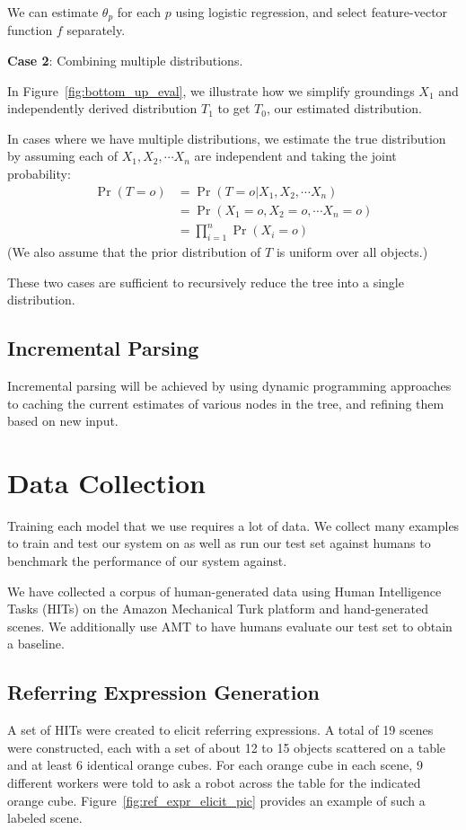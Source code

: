 \documentclass[letterpaper,10pt]{article}
\begin{document}
We can estimate $\theta_p$ for each $p$ using logistic regression, and select feature-vector function $f$ separately.

\textbf{Case 2}: Combining multiple distributions.

In Figure~\ref{fig:bottom_up_eval}, we illustrate how we simplify groundings $X_1$ and independently derived distribution $T_1$ to get $T_0$, our estimated distribution.

In cases where we have multiple distributions, we estimate the true distribution by assuming each of $X_1, X_2, \cdots X_n$ are independent and taking the joint probability:
\begin{align*}
\Pr(T = o) & = \Pr(T = o | X_1, X_2, \cdots X_n)
\\ & = \Pr(X_1 = o, X_2 = o, \cdots X_n = o)
\\ & = \prod_{i = 1}^n\Pr(X_i = o)
\end{align*}
(We also assume that the prior distribution of $T$ is uniform over all objects.)

These two cases are sufficient to recursively reduce the tree into a single distribution.

\subsection{Incremental Parsing}

Incremental parsing will be achieved by using dynamic programming approaches to caching the current estimates of various nodes in the tree, and refining them based on new input. 

\section{Data Collection} 

Training each model that we use requires a lot of data. We collect many examples to train and test our system on as well as run our test set against humans to benchmark the performance of our system against.

We have collected a corpus of human-generated data using Human Intelligence Tasks (HITs) on the Amazon Mechanical Turk platform and hand-generated scenes. We additionally use AMT to have humans evaluate our test set to obtain a baseline.

\subsection{Referring Expression Generation}
A set of HITs were created to elicit referring expressions. A total of 19 scenes were constructed, each with a set of about 12 to 15 objects scattered on a table and at least 6 identical orange cubes. For each orange cube in each scene, 9 different workers were told to ask a robot across the table for the indicated orange cube. Figure~\ref{fig:ref_expr_elicit_pic} provides an example of such a labeled scene.
\end{document}
